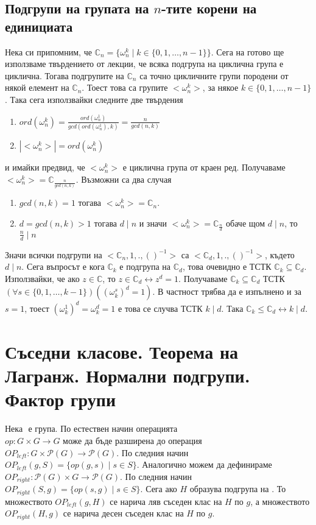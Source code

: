\documentclass[12pt]{article}
\begin{document}
\subsection{Подгрупи на групата на \(n\)-тите корени на единициата}
Нека си припомним, че \(\mathbb{C}_n = \{\omega_n^k \; | \; k \in \{0, 1, \dots, n - 1\}\}\). Сега на готово ще използваме твърдението от лекции, че всяка подгрупа на циклична група е циклична. Тогава подгрупите на \(\mathbb{C}_n\) са точно цикличните групи породени от някой елемент на \(\mathbb{C}_n\). Тоест това са групите \(<\omega_n^k>\), за някое 
\(k \in \{0, 1, \dots, n - 1\}\). Така сега използвайки следните две твърдения
\begin{enumerate}
    \item \(ord(\omega_n^k) = \displaystyle\frac{ord(\omega_n^1)}{gcd(ord(\omega_n^1), k)} = \displaystyle\frac{n}{gcd(n, k)}\)
    \item \(|<\omega_n^k>| = ord(\omega_n^k)\)
\end{enumerate}
и имайки предвид, че \(<\omega_n^k>\) е циклична група от краен ред.
Получаваме \(<\omega_n^k> = \mathbb{C}_{\displaystyle\frac{n}{gcd(n, k)}}\).
Възможни са два случая
\begin{enumerate}
    \item \(gcd(n, k) = 1\) тогава \(<\omega_n^k> = \mathbb{C}_n\).
    \item \(d = gcd(n, k) > 1\) тогава \(d \mid n\) и значи \(<\omega_n^k> = \mathbb{C}_{\displaystyle\frac{n}{d}}\) обаче щом \(d \mid n\), то \(\displaystyle\frac{n}{d} \mid n\)
\end{enumerate}
Значи всички подгрупи на \(<\mathbb{C}_n, 1, . , ()^{-1}>\) са 
\(<\mathbb{C}_d, 1, . , ()^{-1}>\), където \(d \mid n\).
Сега въпросът е кога \(\mathbb{C}_k\) е подгрупа на \(\mathbb{C}_d\),
това очевидно е ТСТК \(\mathbb{C}_k \subseteq \mathbb{C}_d\).
Използвайки, че ако \(z \in \mathbb{C}\), то \(z \in \mathbb{C}_d \longleftrightarrow z^d = 1\). Получаваме \(\mathbb{C}_k \subseteq \mathbb{C}_d\) ТСТК
\((\forall s \in \{0, 1, \dots, k - 1\})((\omega_k^s)^d = 1)\).
В частност трябва да е изпълнено и за \(s = 1\), тоест \((\omega_k^1)^d = \omega_k^d = 1\) е това се случва ТСТК \(k \mid d\). Така \(\mathbb{C}_k \leq \mathbb{C}_d \longleftrightarrow k \mid d\).
\section{Съседни класове. Теорема на Лагранж. Нормални подгрупи. Фактор групи}
Нека \(<G, e, op, inv>\) е група.
По естествен начин операцията \\
\(op : G \times G \to G\)
може да бъде разширена до операция \\
\(OP_{left} : G \times \mathcal{P}(G) \to \mathcal{P}(G)\).
По следния начин \\
\(OP_{left}(g, S) = \{op(g, s) \; | \; s \in S\}\).
Аналогично можем да дефинираме \(OP_{right} : \mathcal{P}(G) \times G \to \mathcal{P}(G)\).
По следния начин \\
\(OP_{right}(S, g) = \{op(s, g) \; | \; s \in S\}\).
Сега ако \(H\) образува подгрупа на \(<G, e, op, inv>\).
То множеството \(OP_{left}(g, H)\) се нарича ляв съседен клас на \(H\) по \(g\),
а множеството \(OP_{right}(H, g)\) се нарича десен съседен клас на \(H\) по \(g\).
\end{document}

